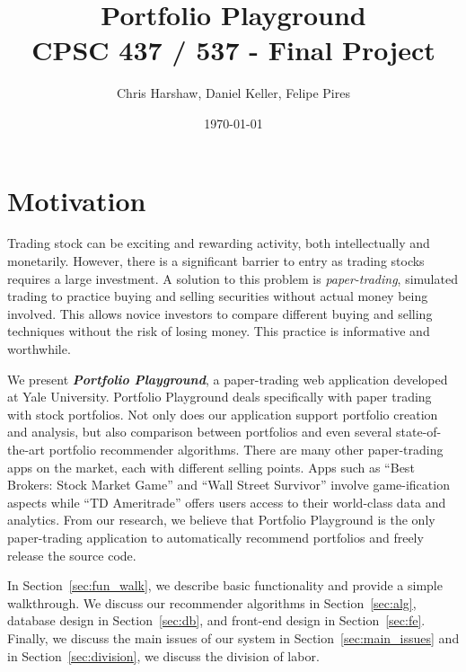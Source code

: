 \documentclass{article}
\begin{document}
\title{Portfolio Playground  \\ CPSC 437 / 537 - Final Project}
\author{Chris Harshaw, Daniel Keller, Felipe Pires}
\date{\today}
\maketitle

\pagestyle{fancy}
\fancyhf{}
\rfoot{\thepage}



\section{Motivation}
Trading stock can be exciting and rewarding activity, both intellectually and monetarily. However, there is a significant barrier to entry as trading stocks requires a large investment. A solution to this problem is \emph{paper-trading}, simulated trading to practice buying and selling securities without actual money being involved. This allows novice investors to compare different buying and selling techniques without the risk of losing money. This practice is informative and worthwhile.

We present \textbf{\emph{Portfolio Playground}}, a paper-trading web application developed at Yale University. Portfolio Playground deals specifically with paper trading with stock portfolios. Not only does our application support portfolio creation and analysis, but also comparison between portfolios and even several state-of-the-art portfolio recommender algorithms. There are many other paper-trading apps on the market, each with different selling points. Apps such as ``Best Brokers: Stock Market Game'' and ``Wall Street Survivor'' involve game-ification aspects while ``TD Ameritrade'' offers users access to their world-class data and analytics. From our research, we believe that Portfolio Playground is the only paper-trading application to automatically recommend portfolios and freely release the source code.

In Section~\ref{sec:fun_walk}, we describe basic functionality and provide a simple walkthrough. We discuss our recommender algorithms in Section~\ref{sec:alg}, database design in Section~\ref{sec:db}, and front-end design in Section~\ref{sec:fe}. Finally, we discuss the main issues of our system in Section~\ref{sec:main_issues} and in Section~\ref{sec:division}, we discuss the division of labor.
\end{document}
